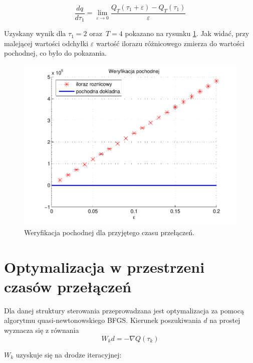 \documentclass[11pt]{mwart}
\begin{document}
\begin{equation}
	\frac{dq}{d\tau_{1}}=\lim_{\varepsilon\rightarrow0}\frac{Q_{T}\left(\tau_{1}+\varepsilon\right)-Q_{T}\left(\tau_{1}\right)}{\varepsilon}
\end{equation}

\pagebreak
Uzyskany wynik dla $\tau_{1}=2$ oraz~$T=4$ pokazano na rysunku \ref{fig-werpochodna}. Jak widać, przy malejącej wartości odchyłki $\varepsilon$ wartość ilorazu różnicowego zmierza do wartości pochodnej, co było do pokazania.

\begin{figure}[H]
	\begin{centering}
	\includegraphics[scale=1.0]{pochodna}
	\caption{Weryfikacja pochodnej dla przyjętego czasu przełączeń.}
	\label{fig-werpochodna}
	\end{centering}
\end{figure}

\section{Optymalizacja w przestrzeni czasów przełączeń}

Dla danej struktury sterowania przeprowadzana jest optymalizacja za pomocą algorytmu quasi-newtonowskiego BFGS. Kierunek poszukiwania $d$ na prostej wyznacza się z równania 
\begin{equation}
	W_{k}d=-\nabla Q\left(\tau_{k}\right)
\end{equation}

$W_{k}$ uzyskuje się na drodze iteracyjnej:
\end{document}
